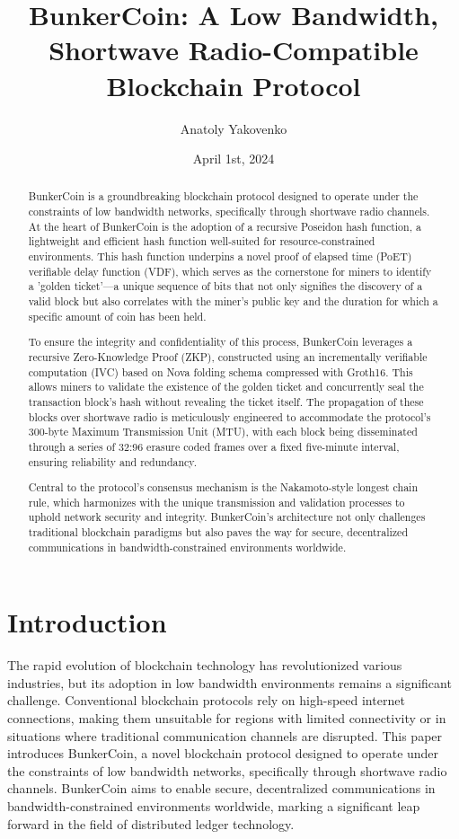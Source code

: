 \documentclass{article}
\title{BunkerCoin: A Low Bandwidth, Shortwave Radio-Compatible Blockchain Protocol}
\author{Anatoly Yakovenko}
\date{April 1st, 2024}
\begin{document}
\maketitle

\section{Introduction}
The rapid evolution of blockchain technology has revolutionized various industries, but its adoption in low bandwidth environments remains a significant challenge. Conventional blockchain protocols rely on high-speed internet connections, making them unsuitable for regions with limited connectivity or in situations where traditional communication channels are disrupted. This paper introduces BunkerCoin, a novel blockchain protocol designed to operate under the constraints of low bandwidth networks, specifically through shortwave radio channels. BunkerCoin aims to enable secure, decentralized communications in bandwidth-constrained environments worldwide, marking a significant leap forward in the field of distributed ledger technology.

\begin{abstract}
BunkerCoin is a groundbreaking blockchain protocol designed to operate under the constraints of low bandwidth networks, specifically through shortwave radio channels. At the heart of BunkerCoin is the adoption of a recursive Poseidon hash function, a lightweight and efficient hash function well-suited for resource-constrained environments. This hash function underpins a novel proof of elapsed time (PoET) verifiable delay function (VDF), which serves as the cornerstone for miners to identify a 'golden ticket'—a unique sequence of bits that not only signifies the discovery of a valid block but also correlates with the miner's public key and the duration for which a specific amount of coin has been held.

To ensure the integrity and confidentiality of this process, BunkerCoin leverages a recursive Zero-Knowledge Proof (ZKP), constructed using an incrementally verifiable computation (IVC) based on Nova folding schema compressed with Groth16. This allows miners to validate the existence of the golden ticket and concurrently seal the transaction block's hash without revealing the ticket itself. The propagation of these blocks over shortwave radio is meticulously engineered to accommodate the protocol's 300-byte Maximum Transmission Unit (MTU), with each block being disseminated through a series of 32:96 erasure coded frames over a fixed five-minute interval, ensuring reliability and redundancy.

Central to the protocol's consensus mechanism is the Nakamoto-style longest chain rule, which harmonizes with the unique transmission and validation processes to uphold network security and integrity. BunkerCoin's architecture not only challenges traditional blockchain paradigms but also paves the way for secure, decentralized communications in bandwidth-constrained environments worldwide.
\end{abstract}
\end{document}
